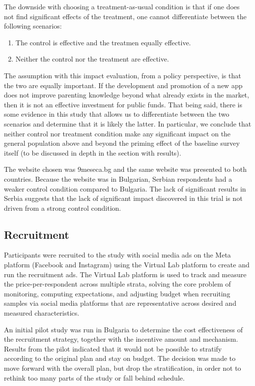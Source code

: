 \documentclass{article}
\begin{document}
The downside with choosing a treatment-as-usual condition is that if one does not find significant effects of the treatment, one cannot differentiate between the following scenarios: 

\begin{enumerate}
    \item The control is effective and the treatmen equally effective.
    \item Neither the control nor the treatment are effective.
\end{enumerate}

The assumption with this impact evaluation, from a policy perspective, is that the two are equally important. If the development and promotion of a new app does not improve parenting knowledge beyond what already exists in the market, then it is not an effective investment for public funds. That being said, there is some evidence in this study that allows us to differentiate between the two scenarios and determine that it is likely the latter. In particular, we conclude that neither control nor treatment condition make any significant impact on the general population above and beyond the priming effect of the baseline survey itself (to be discussed in depth in the section with results).

The website chosen was 9meseca.bg and the same website was presented to both countries. Because the website was in Bulgarian, Serbian respondents had a weaker control condition compared to Bulgaria. The lack of significant results in Serbia suggests that the lack of significant impact discovered in this trial is not driven from a strong control condition. 

\subsection*{Recruitment}

Participants were recruited to the study with social media ads on the Meta platform (Facebook and Instagram) using the Virtual Lab platform to create and run the recruitment ads. The Virtual Lab platform is used to track and measure the price-per-respondent across multiple strata, solving the core problem of monitoring, computing expectations, and adjusting budget when recruiting samples via social media platforms that are representative across desired and measured characteristics. 

An initial pilot study was run in Bulgaria to determine the cost effectiveness of the recruitment strategy, together with the incentive amount and mechanism. Results from the pilot indicated that it would not be possible to stratify according to the original plan and stay on budget. The decision was made to move forward with the overall plan, but drop the stratification, in order not to rethink too many parts of the study or fall behind schedule. 
\end{document}
